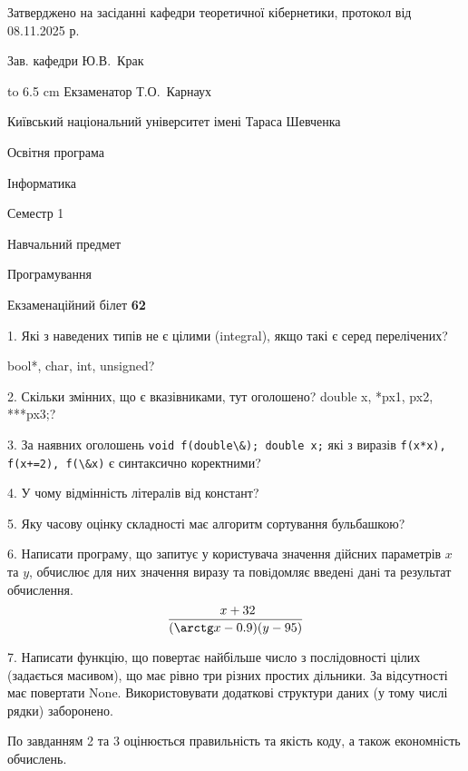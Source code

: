 \documentclass[12pt, ukrainian]{article}
\def\code#1{\Verb!#1!}
\begin{document}
{\smallskip\smallskip \begin {scriptsize} Затверджено на засіданні кафедри теоретичної кібернетики, протокол   від   08.11.2025 р.\par\smallskip\smallskip\smallskip\smallskip
{\parbox {6.5 cm} {Зав. кафедри \dotfill Ю.В.~Крак}}\hspace {0.7cm} {\hbox to 6.5 cm { Екзаменатор \dotfill Т.О.~Карнаух}} \end{scriptsize}}
\vspace{0.9cm}
{{\begin {scriptsize}\par
{ \center  Київський національний університет імені Тараса Шевченка \par}
{\parbox {5 cm}{Освітня програма \hfill}{\parbox {7 cm}{Інформатика\hfill}}\parbox {6 cm}{\hfill Семестр 1}}\par
{\parbox {5 cm} {Навчальний предмет \hfill}\parbox {7 cm}{Програмування \hfill}\parbox {6cm}{\hfill}\par}\vspace{-15pt} \end{scriptsize}}{\center Екзаменаційний білет \No \textbf { 62 }\par}}
{%
1. Які з наведених типів не є цілими (integral), якщо такі є серед перелічених?

bool*, char, int, unsigned?
\par
\vspace{2mm}
2. Скільки змінних, що є вказівниками, тут оголошено?
double x, *px1, px2, ***px3;?
\par
\vspace{2mm}
3. За наявних оголошень \code{void f(double\&); double x;} які з виразів \code{f(x*x), f(x+=2), f(\&x)} є синтаксично коректними?
\par
\vspace{2mm}
4. У чому відмінність літералів від констант?
\par
\vspace{2mm}
5. Яку часову оцінку складності має алгоритм сортування бульбашкою?
\par
\vspace{2mm}
6. Написати програму, що запитує у користувача значення дійсних параметрів $x$ та $y$, обчислює для них значення виразу та повiдомляє введенi данi та результат обчислення.
$$\frac{\ x + 32}{(\arctg x - 0.9) (y - 95)}$$ 

\par
7. Написати функцію, що повертає найбільше число з послідовності цілих (задається масивом), що має рівно три різних простих дільники. За відсутності має повертати None. Використовувати додаткові структури даних (у тому числі рядки) заборонено.

По завданням 2 та 3 оцінюється правильність та якість коду, а також економність обчислень.

}
\end{document}
